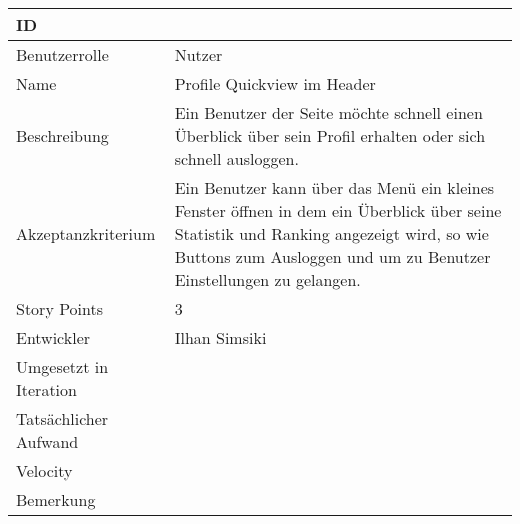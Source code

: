 \begin{tabularx}{\textwidth}{|p{}|X|}
	\hline
	ID & \\
	\hline
	Benutzerrolle & Nutzer\\
	\hline
	Name & Profile Quickview im Header\\
	\hline
	Beschreibung & Ein Benutzer der Seite möchte schnell einen Überblick über sein Profil erhalten oder sich schnell ausloggen.\\
	\hline
	Akzeptanzkriterium & Ein Benutzer kann über das Menü ein kleines Fenster öffnen in dem ein Überblick über seine Statistik und Ranking angezeigt wird, so wie Buttons zum Ausloggen und um zu Benutzer Einstellungen zu gelangen.\\
	\hline
	Story Points & 3\\
	\hline
	Entwickler & Ilhan Simsiki\\
	\hline
	Umgesetzt in Iteration & \\
	\hline
	Tatsächlicher Aufwand & \\
	\hline
	Velocity & \\
	\hline
	Bemerkung & \\
	\hline
\end{tabularx}
\vspace{20pt}
